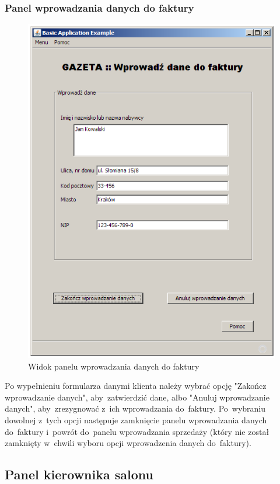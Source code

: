 \subsubsection{Panel wprowadzania danych do faktury}
\begin{figure}[h]
\includegraphics[width=1\textwidth]{gfx/dane_faktury.png}
\caption{Widok panelu wprowadzania danych do faktury}
\end{figure}
Po wypełnieniu formularza danymi klienta należy wybrać opcję "Zakończ wprowadzanie danych", aby~zatwierdzić dane, albo "Anuluj wprowadzanie danych", aby~zrezygnować z~ich wprowadzania do~faktury. Po~wybraniu dowolnej z~tych opcji następuje zamknięcie panelu wprowadzania danych do~faktury i~powrót do~panelu wprowadzania sprzedaży (który nie został zamknięty w~chwili wyboru opcji wprowadzenia danych do~faktury).
\clearpage
\subsection{Panel kierownika salonu}
